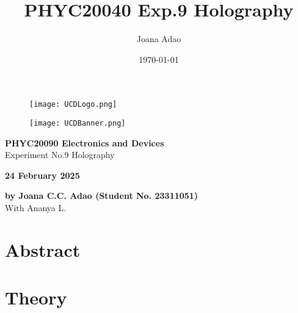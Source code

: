 \documentclass[12pt]{article}
\title{PHYC20040 Exp.9 Holography}
\author{Joana Adao}
\date{\today}
\begin{document}
\begin{titlepage}
    \begin{center}

        \begin{figure}[ht]
            \texttt{[image: UCDLogo.png]}
        \end{figure}
        
        \begin{figure}
            \centerline{\texttt{[image: UCDBanner.png]}}
        \end{figure}

        \vspace{4cm}

        {\LARGE \bfseries PHYC20090 Electronics and Devices}\\
        \vspace{0.75cm}
        {\Large Experiment No.9 Holography}
        
        \vspace{1cm}
    
    {\Large \textbf{24 February 2025}}

    \vspace{2cm}
    
    {\large \textbf{by Joana C.C. Adao (Student No. 23311051)}}\\
    \medskip
    {\large With Ananya L.}

    \end{center}
    
   \clearpage

\end{titlepage}


\tableofcontents
\thispagestyle{empty}

\newpage

\section*{Abstract}
\thispagestyle{empty}



\newpage


\setcounter{page}{1}
\section{Theory} \label{sec:1}




\newpage



 \label{sec:ref}

\vspace{1.5cm}

\listoffigures
\end{document}
